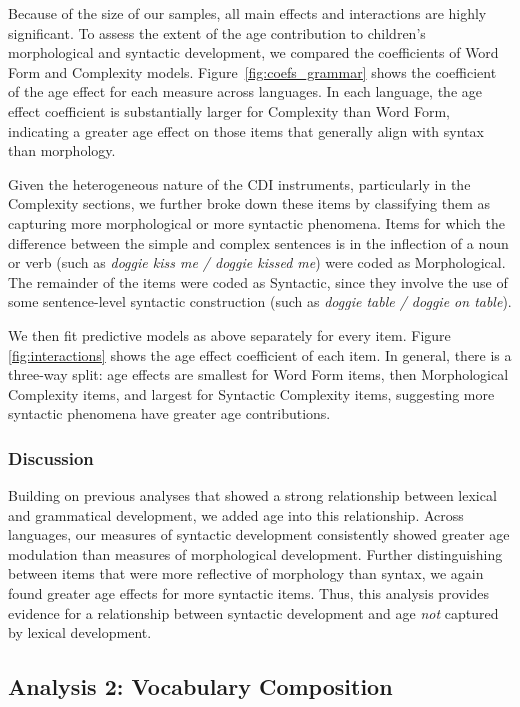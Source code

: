 \documentclass[10pt,letterpaper]{article}
\begin{document}
Because of the size of our samples, all main effects and interactions are highly significant. To assess the extent of the age contribution to children's morphological and syntactic development, we compared the coefficients of Word Form and Complexity models. Figure~\ref{fig:coefs_grammar} shows the coefficient of the age effect for each measure across languages. In each language, the age effect coefficient is substantially larger for Complexity than Word Form, indicating a greater age effect on those items that generally align with syntax than morphology.

Given the heterogeneous nature of the CDI instruments, particularly in the Complexity sections, we further broke down these items by classifying them as capturing more morphological or more syntactic phenomena. Items for which the difference between the simple and complex sentences is in the inflection of a noun or verb (such as \emph{doggie kiss me / doggie kissed me}) were coded as Morphological. The remainder of the items were coded as Syntactic, since they involve the use of some sentence-level syntactic construction (such as \emph{doggie table / doggie on table}).

We then fit predictive models as above separately for every item. Figure \ref{fig:interactions} shows the age effect coefficient of each item. In general, there is a three-way split: age effects are smallest for Word Form items, then Morphological Complexity items, and largest for Syntactic Complexity items, suggesting more syntactic phenomena have greater age contributions. 

\vfill
\subsubsection{Discussion}

Building on previous analyses that showed a strong relationship between lexical and grammatical development, we added age into this relationship. Across languages, our measures of syntactic development consistently showed greater age modulation than measures of morphological development. Further distinguishing between items that were more reflective of morphology than syntax, we again found greater age effects for more syntactic items. Thus, this analysis provides evidence for a relationship between syntactic development and age \emph{not} captured by lexical development.

\subsection{Analysis 2: Vocabulary Composition}
\end{document}
